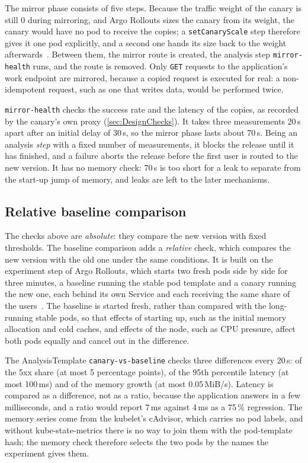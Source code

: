 The mirror phase consists of five steps. Because the traffic weight of the canary is still 0 during mirroring, and Argo Rollouts sizes the canary from its weight, the canary would have no pod to receive the copies; a \texttt{setCanaryScale} step therefore gives it one pod explicitly, and a second one hands its size back to the weight afterwards~\cite{ArgoRolloutsCanary}. Between them, the mirror route is created, the analysis step \texttt{mirror-health} runs, and the route is removed. Only \texttt{GET} requests to the application's work endpoint are mirrored, because a copied request is executed for real: a non-idempotent request, such as one that writes data, would be performed twice.

\texttt{mirror-health} checks the success rate and the latency of the copies, as recorded by the canary's own proxy (\autoref{sec:DesignChecks}). It takes three measurements 20\,s apart after an initial delay of 30\,s, so the mirror phase lasts about 70\,s. Being an analysis \emph{step} with a fixed number of measurements, it blocks the release until it has finished, and a failure aborts the release before the first user is routed to the new version. It has no memory check: 70\,s is too short for a leak to separate from the start-up jump of memory, and leaks are left to the later mechanisms.

\subsection{Relative baseline comparison}
\label{sec:DesignExperiment}
The checks above are \emph{absolute}: they compare the new version with fixed thresholds. The baseline comparison adds a \emph{relative} check, which compares the new version with the old one under the same conditions. It is built on the experiment step of Argo Rollouts, which starts two fresh pods side by side for three minutes, a baseline running the stable pod template and a canary running the new one, each behind its own Service and each receiving the same share of the users~\cite{ArgoRolloutsExperiment}. The baseline is started fresh, rather than compared with the long-running stable pods, so that effects of starting up, such as the initial memory allocation and cold caches, and effects of the node, such as CPU pressure, affect both pods equally and cancel out in the difference.

The AnalysisTemplate \texttt{canary-vs-baseline} checks three differences every 20\,s: of the 5xx share (at most 5 percentage points), of the 95th percentile latency (at most 100\,ms) and of the memory growth (at most 0.05\,MiB/s). Latency is compared as a difference, not as a ratio, because the application answers in a few milliseconds, and a ratio would report 7\,ms against 4\,ms as a 75\,\% regression. The memory series come from the kubelet's cAdvisor, which carries no pod labels, and without kube-state-metrics there is no way to join them with the pod-template hash; the memory check therefore selects the two pods by the names the experiment gives them.


